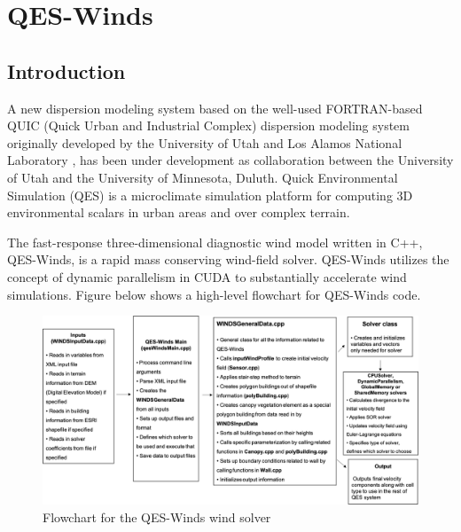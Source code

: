 \chapter{QES-Winds}

\section{Introduction}

A new dispersion modeling system based on the well-used FORTRAN-based QUIC (Quick Urban and Industrial Complex) dispersion modeling system originally developed by the University of Utah and Los Alamos National Laboratory \cite{brown2013quic}, has been under development as collaboration between the University of Utah and the University of Minnesota, Duluth. Quick Environmental Simulation (QES) is a microclimate simulation platform for computing 3D environmental scalars in urban areas and over complex terrain. 


The fast-response three-dimensional diagnostic wind model written in C++, QES-Winds, is a rapid mass conserving wind-field solver. QES-Winds utilizes the concept of dynamic parallelism in CUDA to substantially accelerate wind simulations. Figure below shows a high-level flowchart for QES-Winds code.

\begin{figure}[H]
\includegraphics[width=17cm]{Images/QES_flowchart.png}
\caption{Flowchart for the QES-Winds wind solver}
\end{figure}


